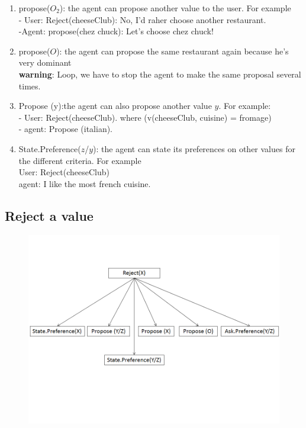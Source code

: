 \documentclass{llncs}
\begin{document}
\begin{enumerate}
 
\item propose($O_2$): the agent can  propose another value to the user. For example
\\ - User: Reject(cheeseClub): No, I'd raher choose another restaurant.
\\ -Agent: propose(chez chuck): Let's choose chez chuck!

\item propose($O$): the agent can  propose the same restaurant again because he's very dominant
\\ \textbf{warning}: Loop, we have to stop the agent to make the same proposal several times.


\item Propose (y):the agent  can also propose another value $y$. 
For example:
\\ - User: Reject(cheeseClub). where (v(cheeseClub, cuisine) = fromage)
\\ - agent: Propose (italian). 

\item State.Preference($z$/$y$): the agent can state its preferences on other values for the different criteria. For example
\\ User: Reject(cheeseClub)
\\ agent: I like the most french cuisine. 

\end{enumerate}

\subsection{Reject a value}
\begin{figure}
\centerline{\includegraphics[width=5in]{figs/rejectX.PNG}}
\vskip 8pt
\end{figure}
\end{document}
